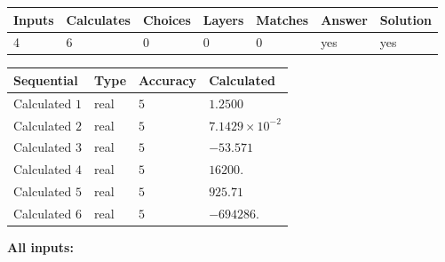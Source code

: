 \documentclass[12pt]{article}
\begin{document}
   
\noindent\begin{tabular}{|l|l|l|l|l|l|l|}
 \hline
Inputs & Calculates & Choices & Layers & Matches & Answer & Solution \\ \hline
           4  & 
           6  & 
           0
  & 
           0  & 
           0  & 
  yes & 
  yes 
  \\ \hline
 \end{tabular}
   
   
   
   
\noindent{}
   
   
  
  
\noindent\begin{tabular}{|l|l|l|l|}
\hline
 Sequential & Type & Accuracy & Calculated \\ 
\hline
 
 
  Calculated $            1 $ & real & $            5  $ & 
 $ 1.2500 $ 
 \\  \hline  
 
 
  Calculated $            2 $ & real & $            5  $ & 
 $ 7.1429 \times 10^{-2} $ 
 \\  \hline  
 
 
  Calculated $            3 $ & real & $            5  $ & 
 $ -53.571 $ 
 \\  \hline  
 
 
  Calculated $            4 $ & real & $            5  $ & 
 $ 16200. $ 
 \\  \hline  
 
 
  Calculated $            5 $ & real & $            5  $ & 
 $ 925.71 $ 
 \\  \hline  
 
 
  Calculated $            6 $ & real & $            5  $ & 
 $ -694286. $ 
 \\  \hline  
 \end{tabular}
   
   
   
   
\noindent\vspace{0.1in}\hspace{-0.08in} {\textbf{\Large{All inputs: }}}
   
   
  
\end{document}

